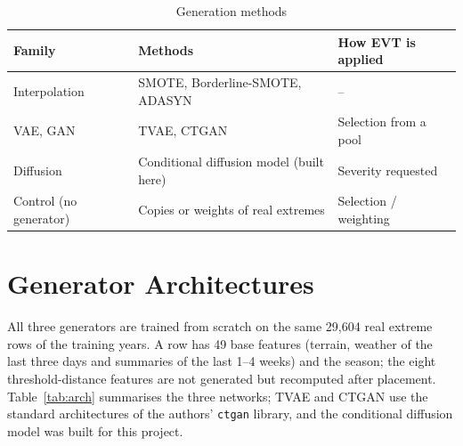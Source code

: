 \documentclass[12pt,a4paper]{report}
\begin{document}
\begin{table}[H]
\centering
\caption{Generation methods}
\label{tab:methods}
\small
\begin{tabular}{|l|l|l|}
\hline
\textbf{Family} & \textbf{Methods} & \textbf{How EVT is applied}\\ \hline
Interpolation & SMOTE, Borderline-SMOTE, ADASYN & -- \\ \hline
VAE, GAN & TVAE, CTGAN & Selection from a pool \\ \hline
Diffusion & Conditional diffusion model (built here) & Severity requested \\ \hline
Control (no generator) & Copies or weights of real extremes & Selection / weighting \\ \hline
\end{tabular}
\end{table}

\section{Generator Architectures}
\label{sec:arch}
All three generators are trained from scratch on the same 29{,}604 real extreme rows of the training years. A row has
49 base features (terrain, weather of the last three days and summaries of the last 1--4 weeks) and the season; the
eight threshold-distance features are not generated but recomputed after placement. Table~\ref{tab:arch} summarises
the three networks; TVAE and CTGAN use the standard architectures of the authors' \texttt{ctgan} library, and the
conditional diffusion model was built for this project.
\end{document}
